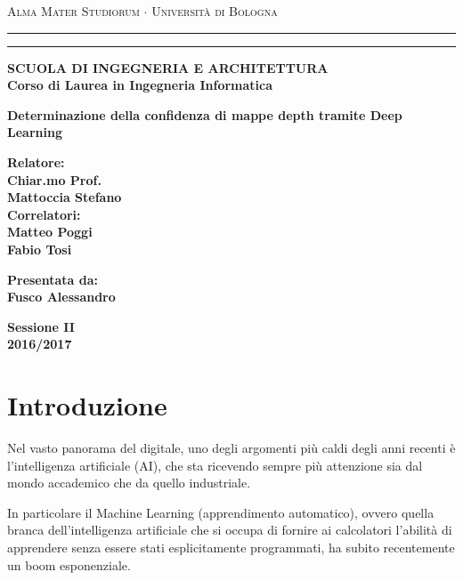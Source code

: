 \documentclass[12pt,a4paper]{report}
\begin{document}
\begin{titlepage}
\begin{center}
    {{\Large{\textsc{
        Alma Mater Studiorum $\cdot$ Università di Bologna
    }}}}
    \rule[0.1cm]{15.8cm}{0.1mm}
    \rule[0.5cm]{15.8cm}{0.6mm}
{\small{\bf 
    SCUOLA DI INGEGNERIA E ARCHITETTURA\\
    Corso di Laurea in Ingegneria Informatica
}}
\end{center}
\vspace{15mm}
\begin{center}
{\LARGE{\bf
    Determinazione della confidenza di mappe depth tramite Deep Learning
}}\\
\vspace{3mm}
\end{center}
\vspace{40mm}
\par
\noindent
\begin{minipage}[t]{0.47\textwidth}
{\large{\bf Relatore:\\
Chiar.mo Prof.\\
Mattoccia Stefano \\ 

Correlatori: \\
Matteo Poggi \\
Fabio Tosi}}
\end{minipage}
\hfill
\begin{minipage}[t]{0.47\textwidth}\raggedleft
{\large{\bf Presentata da:\\
Fusco Alessandro}}
\end{minipage}
\vspace{20mm}
\begin{center}
{\large{\bf 
    Sessione II\\
    2016/2017
}}
\end{center}
\end{titlepage}

\tableofcontents{}


\chapter{Introduzione}
Nel vasto panorama del digitale, uno degli argomenti più caldi degli anni
recenti è l'intelligenza artificiale (AI), che sta ricevendo sempre più
attenzione sia dal mondo accademico che da quello industriale. 

In particolare il Machine Learning (apprendimento automatico), ovvero quella
branca dell'intelligenza artificiale che si occupa di fornire ai calcolatori
l'abilità di apprendere senza essere stati esplicitamente programmati, ha
subito recentemente un boom esponenziale.
\end{document}
